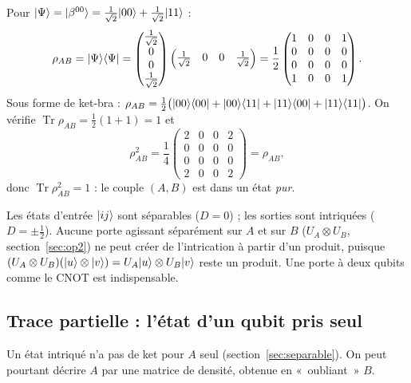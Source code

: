 Pour $|\Psi\rangle=|\beta^{00}\rangle=\frac{1}{\sqrt2}|00\rangle+\frac{1}{\sqrt2}|11\rangle$ :
\[
  \rho_{AB}=|\Psi\rangle\langle \Psi|
  =\begin{pmatrix}\frac{1}{\sqrt2}\\0\\0\\\frac{1}{\sqrt2}\end{pmatrix}
   \begin{pmatrix}\frac{1}{\sqrt2}&0&0&\frac{1}{\sqrt2}\end{pmatrix}
  =\frac12\begin{pmatrix}1&0&0&1\\0&0&0&0\\0&0&0&0\\1&0&0&1\end{pmatrix}.
\]
Sous forme de ket-bra :
$\rho_{AB}=\frac12\big(|00\rangle\langle 00|+|00\rangle\langle 11|+|11\rangle\langle 00|+|11\rangle\langle 11|\big)$.
On vérifie $\operatorname{Tr}\rho_{AB}=\frac12(1+1)=1$ et
\[
  \rho_{AB}^2=\frac14\begin{pmatrix}2&0&0&2\\0&0&0&0\\0&0&0&0\\2&0&0&2\end{pmatrix}=\rho_{AB},
\]
donc $\operatorname{Tr}\rho_{AB}^2=1$ : le couple $(A,B)$ est dans un état \emph{pur}.

\begin{remarque}
Les états d'entrée $|ij\rangle$ sont séparables ($D=0$) ; les sorties sont intriquées
($D=\pm\frac12$). Aucune porte agissant séparément sur $A$ et sur $B$ ($U_A\otimes U_B$,
section~\ref{sec:op2}) ne peut créer de l'intrication à partir d'un produit, puisque
$(U_A\otimes U_B)(|u\rangle\otimes|v\rangle)=U_A|u\rangle\otimes U_B|v\rangle$ reste un produit.
Une porte à deux qubits comme le CNOT est indispensable.
\end{remarque}

\subsection{Trace partielle : l'état d'un qubit pris seul}\label{sec:trace}

Un état intriqué n'a pas de ket pour $A$ seul (section~\ref{sec:separable}). On peut pourtant
décrire $A$ par une matrice de densité, obtenue en «~oubliant~» $B$.


